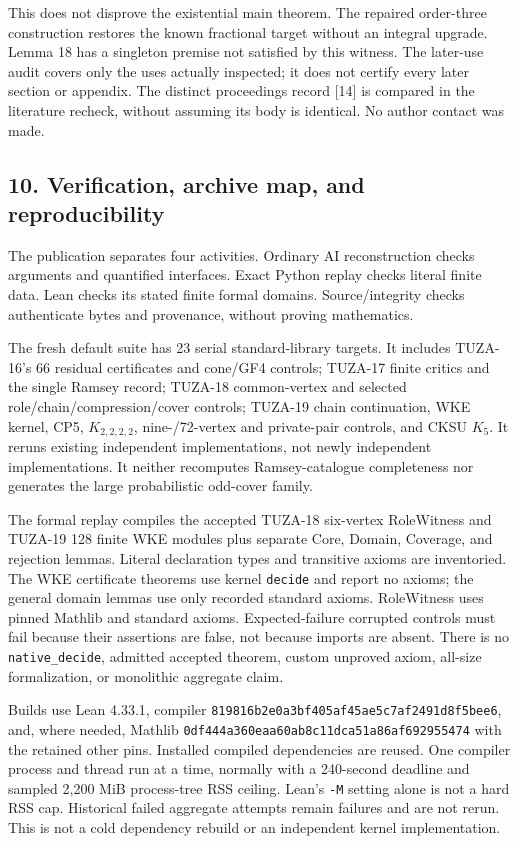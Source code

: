 \documentclass[11pt,a4paper]{article}
\begin{document}
This does not disprove the existential main theorem. The repaired order-three construction restores the known fractional target without an integral upgrade. Lemma 18 has a singleton premise not satisfied by this witness. The later-use audit covers only the uses actually inspected; it does not certify every later section or appendix. The distinct proceedings record {[}14{]} is compared in the literature recheck, without assuming its body is identical. No author contact was made.

\subsection{10. Verification, archive map, and reproducibility}\label{verification-archive-map-and-reproducibility}

The publication separates four activities. Ordinary AI reconstruction checks arguments and quantified interfaces. Exact Python replay checks literal finite data. Lean checks its stated finite formal domains. Source/integrity checks authenticate bytes and provenance, without proving mathematics.

The fresh default suite has 23 serial standard-library targets. It includes TUZA-16's 66 residual certificates and cone/GF4 controls; TUZA-17 finite critics and the single Ramsey record; TUZA-18 common-vertex and selected role/chain/compression/cover controls; TUZA-19 chain continuation, WKE kernel, CP5, \(K_{2,2,2,2}\), nine-/72-vertex and private-pair controls, and CKSU \(K_5\). It reruns existing independent implementations, not newly independent implementations. It neither recomputes Ramsey-catalogue completeness nor generates the large probabilistic odd-cover family.

The formal replay compiles the accepted TUZA-18 six-vertex RoleWitness and TUZA-19 128 finite WKE modules plus separate Core, Domain, Coverage, and rejection lemmas. Literal declaration types and transitive axioms are inventoried. The WKE certificate theorems use kernel \texttt{decide} and report no axioms; the general domain lemmas use only recorded standard axioms. RoleWitness uses pinned Mathlib and standard axioms. Expected-failure corrupted controls must fail because their assertions are false, not because imports are absent. There is no \texttt{native\_decide}, admitted accepted theorem, custom unproved axiom, all-size formalization, or monolithic aggregate claim.

Builds use Lean 4.33.1, compiler \texttt{819816b2e0a3bf405af45ae5c7af2491d8f5bee6}, and, where needed, Mathlib \texttt{0df444a360eaa60ab8c11dca51a86af692955474} with the retained other pins. Installed compiled dependencies are reused. One compiler process and thread run at a time, normally with a 240-second deadline and sampled 2,200 MiB process-tree RSS ceiling. Lean's \texttt{-M} setting alone is not a hard RSS cap. Historical failed aggregate attempts remain failures and are not rerun. This is not a cold dependency rebuild or an independent kernel implementation.
\end{document}
